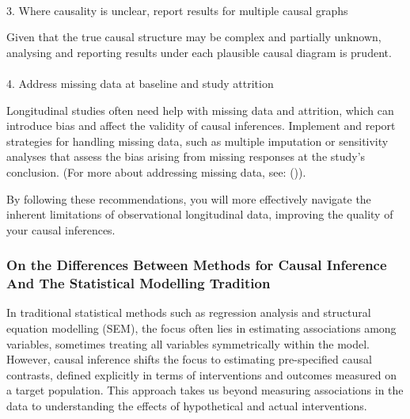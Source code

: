 \documentclass[
  singlecolumn]{article}
\makeatletter
\let\oldparagraph\paragraph
\renewcommand{\paragraph}{
    \@ifstar
      \xxxParagraphStar
      \xxxParagraphNoStar
  }
\newcommand{\xxxParagraphStar}[1]{\oldparagraph*{#1}\mbox{}}
\newcommand{\xxxParagraphNoStar}[1]{\oldparagraph{#1}\mbox{}}
\makeatother
\begin{document}
\paragraph{3. Where causality is unclear, report results for multiple
causal
graphs}\label{where-causality-is-unclear-report-results-for-multiple-causal-graphs}

Given that the true causal structure may be complex and partially
unknown, analysing and reporting results under each plausible causal
diagram is prudent.

\paragraph{4. Address missing data at baseline and study
attrition}\label{address-missing-data-at-baseline-and-study-attrition}

Longitudinal studies often need help with missing data and attrition,
which can introduce bias and affect the validity of causal inferences.
Implement and report strategies for handling missing data, such as
multiple imputation or sensitivity analyses that assess the bias arising
from missing responses at the study's conclusion. (For more about
addressing missing data, see:
()).

By following these recommendations, you will more effectively navigate
the inherent limitations of observational longitudinal data, improving
the quality of your causal inferences.

\subsubsection{On the Differences Between Methods for Causal Inference
And The Statistical Modelling
Tradition}\label{on-the-differences-between-methods-for-causal-inference-and-the-statistical-modelling-tradition}

In traditional statistical methods such as regression analysis and
structural equation modelling (SEM), the focus often lies in estimating
associations among variables, sometimes treating all variables
symmetrically within the model. However, causal inference shifts the
focus to estimating pre-specified causal contrasts, defined explicitly
in terms of interventions and outcomes measured on a target population.
This approach takes us beyond measuring associations in the data to
understanding the effects of hypothetical and actual interventions.
\end{document}
